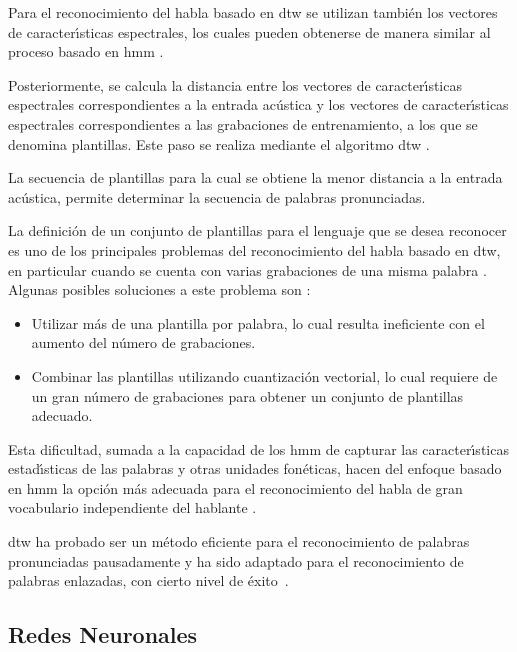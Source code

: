 Para el reconocimiento del habla basado en \gls{dtw} se utilizan tambi\'en los vectores de 
caracter{\'\i}sticas espectrales, los cuales pueden obtenerse de manera similar al proceso 
basado en \gls{hmm} \cite{Hachkar2011}.

Posteriormente, se calcula la distancia entre los vectores de caracter{\'\i}sticas 
espectrales correspondientes a la entrada ac\'ustica y los vectores de caracter{\'\i}sticas 
espectrales correspondientes a las grabaciones de entrenamiento, a los que se denomina plantillas. 
Este paso se realiza mediante el algoritmo \gls{dtw} \cite{Muda2010}.

La secuencia de plantillas para la cual se obtiene la menor distancia a la entrada ac\'ustica,
permite determinar la secuencia de palabras pronunciadas.

La definici\'on de un conjunto de plantillas para el lenguaje que se desea reconocer es uno de
los principales problemas del reconocimiento del habla basado en \gls{dtw}, en particular cuando 
se cuenta con varias grabaciones de una misma palabra \cite{Abdulla2003}. 
Algunas posibles soluciones a este problema son \cite{Abdulla2003}:

\begin{itemize}
    \item Utilizar m\'as de una plantilla por palabra, lo cual resulta ineficiente con el aumento del
    n\'umero de grabaciones.
    \item Combinar las plantillas utilizando cuantizaci\'on vectorial, lo cual requiere de un gran
    n\'umero de grabaciones para obtener un conjunto de plantillas adecuado.
\end{itemize}

Esta dificultad, sumada a la capacidad de los \gls{hmm} de capturar las caracter{\'\i}sticas 
estad{\'\i}sticas de las palabras y otras unidades fon\'eticas, hacen del enfoque basado en \gls{hmm}
la opci\'on m\'as adecuada para el reconocimiento del habla de gran vocabulario independiente del 
hablante \cite{Wong1998}.

\gls{dtw} ha probado ser un m\'etodo eficiente para el reconocimiento de palabras pronunciadas 
pausadamente \cite{MyersALevel1981} y ha sido adaptado para el reconocimiento de palabras enlazadas,
con cierto nivel de \mbox{\'exito \cite{MyersALevel1981, SakoeTwoLevel1979, RabinerApplication1980}}.


\subsection{Redes Neuronales}
\label{sec:otrosModelosANN}


